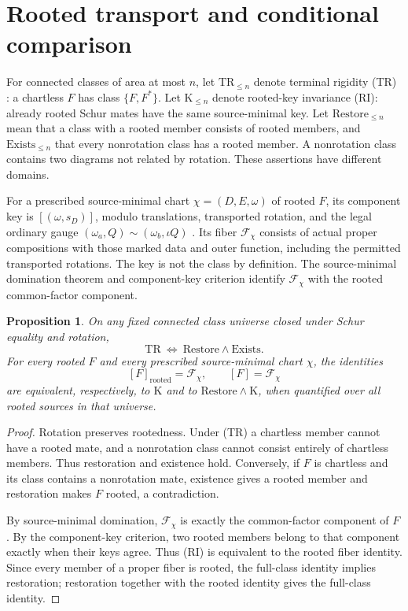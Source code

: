 \documentclass[11pt,a4paper]{amsart}
\numberwithin{equation}{section}
\theoremstyle{plain}
\newtheorem{proposition}[theorem]{Proposition}
\theoremstyle{definition}
\begin{document}
\section{Rooted transport and conditional comparison}\label{sec:assembly}

For connected classes of area at most \(n\), let \(\mathrm{TR}_{\le n}\) denote terminal rigidity (TR) \cite{Shields2026Gluing}: a chartless \(F\) has class \(\{F,F^*\}\).  Let \(\mathrm K_{\le n}\) denote rooted-key invariance (RI): already rooted Schur mates have the same source-minimal key.  Let \(\mathrm{Restore}_{\le n}\) mean that a class with a rooted member consists of rooted members, and \(\mathrm{Exists}_{\le n}\) that every nonrotation class has a rooted member.  A nonrotation class contains two diagrams not related by rotation.  These assertions have different domains.

For a prescribed source-minimal chart \(\chi=(D,E,\omega)\) of rooted \(F\), its component key is \([(\omega,s_D)]\), modulo translations, transported rotation, and the legal ordinary gauge \((\omega_a,Q)\sim(\omega_b,\iota Q)\) \cite{Shields2026Gluing}.  Its fiber \(\mathcal F_\chi\) consists of actual proper compositions with those marked data and outer function, including the permitted transported rotations.  The key is not the class by definition.  The source-minimal domination theorem and component-key criterion identify \(\mathcal F_\chi\) with the rooted common-factor component.

\begin{proposition}\label{prop:rooted-interface}
On any fixed connected class universe closed under Schur equality and rotation,
\[
 \mathrm{TR}\ \Longleftrightarrow\ \mathrm{Restore}\land\mathrm{Exists}.
\]
For every rooted \(F\) and every prescribed source-minimal chart \(\chi\), the identities
\[
 [F]_{\mathrm{rooted}}=\mathcal F_\chi,
 \qquad [F]=\mathcal F_\chi
\]
are equivalent, respectively, to \(\mathrm K\) and to \(\mathrm{Restore}\land\mathrm K\), when quantified over all rooted sources in that universe.
\end{proposition}
\begin{proof}
Rotation preserves rootedness.  Under (TR) a chartless member cannot have a rooted mate, and a nonrotation class cannot consist entirely of chartless members.  Thus restoration and existence hold.  Conversely, if \(F\) is chartless and its class contains a nonrotation mate, existence gives a rooted member and restoration makes \(F\) rooted, a contradiction.

By source-minimal domination, \(\mathcal F_\chi\) is exactly the common-factor component of \(F\).  By the component-key criterion, two rooted members belong to that component exactly when their keys agree.  Thus (RI) is equivalent to the rooted fiber identity.  Since every member of a proper fiber is rooted, the full-class identity implies restoration; restoration together with the rooted identity gives the full-class identity.
\end{proof}
\end{document}
